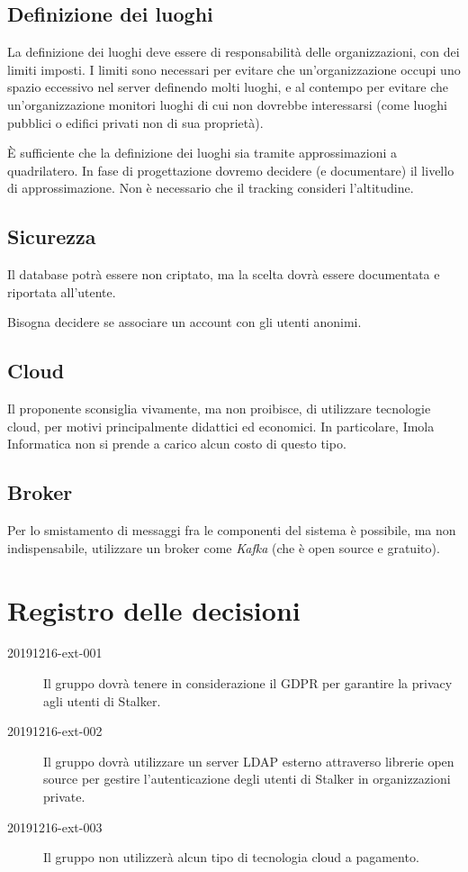 \documentclass{article}
\begin{document}
\subsection{Definizione dei luoghi}%
\label{sub:definizione_dei_luoghi}
La definizione dei luoghi deve essere di responsabilità delle organizzazioni, con dei limiti imposti.
I limiti sono necessari per evitare che un'organizzazione occupi uno spazio eccessivo nel server definendo molti luoghi, e al contempo per evitare che un'organizzazione monitori luoghi di cui non dovrebbe interessarsi (come luoghi pubblici o edifici privati non di sua proprietà).\par
È sufficiente che la definizione dei luoghi sia tramite approssimazioni a quadrilatero.
In fase di progettazione dovremo decidere (e documentare) il livello di approssimazione. Non è necessario che il tracking consideri l'altitudine.
\subsection{Sicurezza}%
\label{sub:sicurezza}
Il database potrà essere non criptato, ma la scelta dovrà essere documentata e riportata all'utente.\par
Bisogna decidere se associare un account con gli utenti anonimi.
\subsection{Cloud}%
\label{sub:cloud}
Il proponente sconsiglia vivamente, ma non proibisce, di utilizzare tecnologie cloud, per motivi principalmente didattici ed economici. In particolare, Imola Informatica non si prende a carico alcun costo di questo tipo.
\subsection{Broker}%
\label{sub:broker}
Per lo smistamento di messaggi fra le componenti del sistema è possibile, ma non indispensabile, utilizzare un broker come \textit{Kafka} (che è open source e gratuito).
\newpage
\section{Registro delle decisioni}%
\label{sec:registro_delle_decisioni}

\begin{description}
  \item[20191216-ext-001] Il gruppo dovrà tenere in considerazione il GDPR per garantire la privacy agli utenti di Stalker.
  \item[20191216-ext-002] Il gruppo dovrà utilizzare un server LDAP esterno attraverso librerie open source per gestire l'autenticazione degli utenti di Stalker in organizzazioni private.
  \item[20191216-ext-003] Il gruppo non utilizzerà alcun tipo di tecnologia cloud a pagamento.
\end{description}

\end{document}
